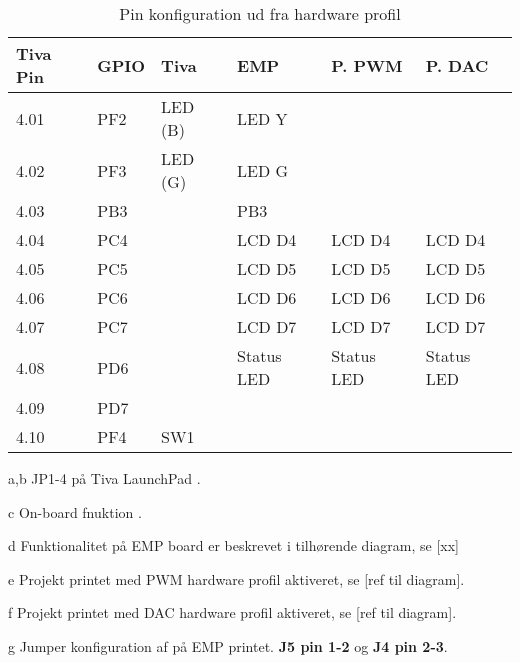 \begin{table}[ht]
	\caption{Pin konfiguration ud fra hardware profil}
	\begin{threeparttable}
		\begin{tabular}{l l l l l l}
			\toprule
			\textbf{Tiva Pin\tnote{a}} 	& 
			\textbf{GPIO\tnote{b}}  	&
			\textbf{Tiva\tnote{c}} 		& 
			\textbf{EMP\tnote{d}}  		&
			\textbf{P. PWM\tnote{e}} 	&
			\textbf{P. DAC\tnote{f}}	\\ 
			\midrule
			4.01 & PF2	&LED (B)& LED Y			&				&				\\
			4.02 & PF3	&LED (G)& LED G			&				&				\\
			4.03 & PB3	&		& PB3			&				&				\\
			4.04 & PC4	&		& LCD D4		& LCD D4		& LCD D4		\\
			4.05 & PC5	&		& LCD D5		& LCD D5		& LCD D5		\\
			4.06 & PC6	&		& LCD D6		& LCD D6		& LCD D6		\\
			4.07 & PC7	&		& LCD D7		& LCD D7		& LCD D7		\\
			4.08 & PD6	&		& Status LED	& Status LED	& Status LED	\\
			4.09 & PD7	&		& 				&				&				\\
			4.10 & PF4	& SW1	& 				&				&				\\
			\bottomrule
		\end{tabular}
		
		\begin{tablenotes}
			\item[a,b] JP1-4 på Tiva LaunchPad \cite[Afsnit 2.1.5 s. 9]{spmu296}.
			\item[c] On-board fnuktion  \cite[Afsnit 2.1.5 s. 9]{spmu296}.
			\item[d] Funktionalitet på EMP board er beskrevet i tilhørende diagram, se [xx]
			\item[e] Projekt printet med PWM hardware profil aktiveret, se [ref til diagram].
			\item[f] Projekt printet med DAC hardware profil aktiveret, se [ref til diagram].
			\item[g] Jumper konfiguration af på EMP printet. \textbf{J5 pin 1-2} og \textbf{J4 pin 2-3}.
		\end{tablenotes}
	\end{threeparttable}
\end{table}
